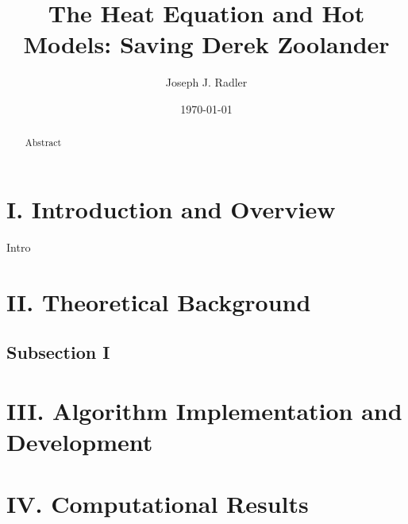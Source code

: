 \documentclass[11pt]{article}
\title{The Heat Equation and Hot Models: Saving Derek Zoolander}
\author{Joseph J. Radler}
\date{\today}                                           %
\begin{document}
\maketitle
\begin{abstract}

Abstract

\end{abstract}

\section*{I.	Introduction and Overview}


Intro 


\section*{II.	Theoretical Background}
\subsection*{Subsection I}




\section*{III.	Algorithm Implementation and Development}




\section*{IV.	Computational Results}


\end{document}
